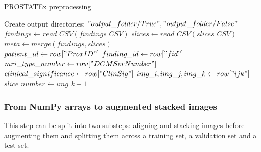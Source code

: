 \begin{algorithm}
    \caption{PROSTATEx preprocessing}
    \label{alg:PROSTATEx_preprocessing}
    \begin{algorithmic}[1] %
        		\State Create output directories: $"output\_folder/True", "output\_folder/False"$\\
        		\State $findings \gets read\_CSV(findings\_CSV)$ 
        		\State $slices \gets read\_CSV(slices\_CSV)$ 
			\State $meta \gets merge(findings, slices)$\\
            		\State $patient\_id \gets row["ProxID"]$
            		\State $finding\_id \gets row["fid"]$
            		\State $mri\_type\_number \gets row["DCMSerNumber"]$
            		\State $clinical\_significance \gets row["ClinSig"]$
            		\State $img\_i, img\_j, img\_k \gets row["ijk"]$
            		\State $slice\_number \gets img\_k + 1$ \\
                						 
                					\EndIf
                				\EndFor
                			\EndIf
            			\EndFor
            		\EndFor
            \EndFor
        \EndProcedure
    \end{algorithmic}
\end{algorithm} 


\subsubsection{From NumPy arrays to augmented stacked images}
\label{sec:numpyToAugmentedStacked}
\setlength{\marginparwidth}{3cm}\leavevmode {}This step can be split into two substeps: aligning and stacking images before augmenting them and splitting them across a training set, a validation set and a test set.

